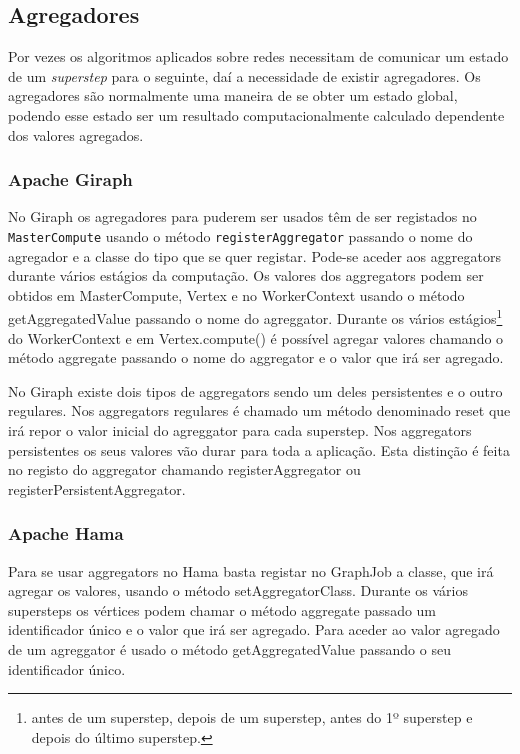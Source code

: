 \newpage

\subsection{Agregadores}
  Por vezes os algoritmos aplicados sobre redes necessitam de comunicar um estado de um \textit{superstep} para o seguinte, daí a necessidade de existir agregadores. Os agregadores são normalmente uma maneira de se obter um estado global, podendo esse estado ser um resultado computacionalmente calculado dependente dos valores agregados.
  \subsubsection*{Apache Giraph}
    No Giraph os agregadores para puderem ser usados têm de ser registados no \texttt{MasterCompute} usando o método \texttt{registerAggregator}
    passando o nome do agregador e a classe do tipo que se quer registar. Pode-se aceder aos aggregators durante vários estágios da computação.
    Os valores dos aggregators podem ser obtidos em MasterCompute, Vertex e no WorkerContext usando o método getAggregatedValue passando
    o nome do agreggator.
    Durante os vários estágios\footnote{antes de um superstep, depois de um superstep, 
    antes do 1º superstep e depois do último superstep.} do WorkerContext e em Vertex.compute() é possível agregar valores chamando o método
    aggregate passando o nome do aggregator e o valor que irá ser agregado.
    
    No Giraph existe dois tipos de aggregators sendo um deles persistentes e o outro regulares. Nos aggregators regulares é chamado um método
    denominado reset que irá repor o valor inicial do agreggator para cada superstep. Nos aggregators persistentes os seus valores vão durar
    para toda a aplicação. Esta distinção é feita no registo do aggregator chamando registerAggregator 
    ou registerPersistentAggregator.
    
  \subsubsection*{Apache Hama}
    Para se usar aggregators no Hama basta registar no GraphJob a classe, que irá agregar os valores, usando o método
    setAggregatorClass. Durante os vários supersteps os vértices podem chamar o método aggregate passado um identificador único
    e o valor que irá ser agregado. Para aceder ao valor agregado de um agreggator é usado o método getAggregatedValue passando o seu 
    identificador único.
    
